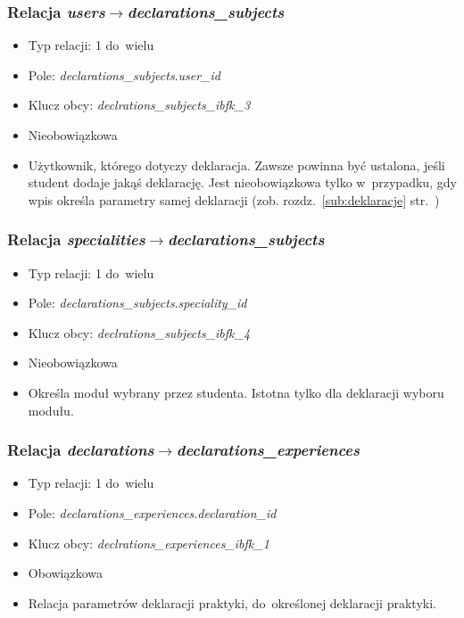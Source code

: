\documentclass[a4paper,12pt,oneside]{report}
\begin{document}
\subsubsection{Relacja \emph{users}$\to$\emph{declarations\_subjects}}
\label{subsub:users-declarations_subjects}
\begin{itemize}
  \item Typ relacji: 1 do~wielu
  \item Pole: \emph{declarations\_subjects}.\emph{user\_id}
  \item Klucz obcy: \emph{declrations\_subjects\_ibfk\_3}
  \item Nieobowiązkowa
  \item Użytkownik, którego dotyczy deklaracja. Zawsze powinna być ustalona, jeśli student dodaje jakąś deklarację. Jest nieobowiązkowa tylko w~przypadku, gdy wpis określa parametry samej deklaracji (zob. rozdz.~\ref{sub:deklaracje} str.~\pageref{sub:deklaracje})
\end{itemize}

\subsubsection{Relacja \emph{specialities}$\to$\emph{declarations\_subjects}}
\label{subsub:specialities-declarations_subjects}
\begin{itemize}
  \item Typ relacji: 1 do~wielu
  \item Pole: \emph{declarations\_subjects}.\emph{speciality\_id}
  \item Klucz obcy: \emph{declrations\_subjects\_ibfk\_4}
  \item Nieobowiązkowa
  \item Określa moduł wybrany przez studenta. Istotna tylko dla deklaracji wyboru modułu.
\end{itemize}

\subsubsection{Relacja \emph{declarations}$\to$\emph{declarations\_experiences}}
\label{subsub:declarations-declarations_experiences}
\begin{itemize}
  \item Typ relacji: 1 do~wielu
  \item Pole: \emph{declarations\_experiences}.\emph{declaration\_id}
  \item Klucz obcy: \emph{declrations\_experiences\_ibfk\_1}
  \item Obowiązkowa
  \item Relacja parametrów deklaracji praktyki, do~określonej deklaracji praktyki.
\end{itemize}
\end{document}

